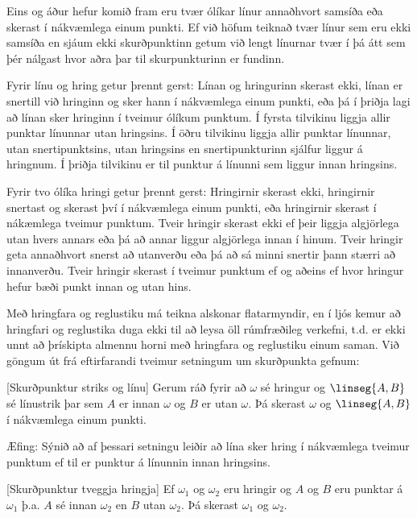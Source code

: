 Eins og áður hefur komið fram eru tvær ólíkar línur annaðhvort samsíða eða skerast í nákvæmlega einum punkti. Ef við höfum teiknað tvær línur sem eru ekki samsíða en sjáum ekki skurðpunktinn getum við lengt línurnar tvær í þá átt sem þér nálgast hvor aðra þar til skurpunkturinn er fundinn.

Fyrir línu og hring getur þrennt gerst: Línan og hringurinn skerast ekki, línan er snertill við hringinn og \glqq sker\grqq{} hann í nákvæmlega einum punkti, eða þá í þriðja lagi að línan sker hringinn í tveimur ólíkum punktum. Í fyrsta tilvikinu liggja allir punktar línunnar utan hringsins. Í öðru tilvikinu liggja allir punktar línunnar, utan snertipunktsins, utan hringsins en snertipunkturinn sjálfur liggur á hringnum. Í þriðja tilvikinu er til punktur á línunni sem liggur innan hringsins.

Fyrir tvo ólíka hringi getur þrennt gerst: Hringirnir skerast ekki, hringirnir snertast og skerast því í nákvæmlega einum punkti, eða hringirnir skerast í nákæmlega tveimur punktum. Tveir hringir skerast ekki ef þeir liggja algjörlega utan hvers annars eða þá að annar liggur algjörlega innan í hinum. Tveir hringir geta annaðhvort snerst að utanverðu eða þá að sá minni snertir þann stærri að innanverðu. Tveir hringir skerast í tveimur punktum ef og aðeins ef hvor hringur hefur bæði punkt innan og utan hins.

Með hringfara og reglustiku má teikna alskonar flatarmyndir, en í ljós kemur að hringfari og reglustika duga ekki til að leysa öll rúmfræðileg verkefni, t.d. er ekki unnt að þrískipta almennu horni með hringfara og reglustiku einum saman. Við göngum út frá eftirfarandi tveimur setningum um skurðpunkta gefnum:

\begin{theorem}\label{concirc_1}[Skurðpunktur striks og línu]
Gerum ráð fyrir að $\omega$ sé hringur og $\linseg{A,B}$ sé línustrik þar sem $A$ er innan $\omega$ og $B$ er utan $\omega$. Þá skerast $\omega$ og $\linseg{A,B}$ í nákvæmlega einum punkti.
\end{theorem}

Æfing: Sýnið að af þessari setningu leiðir að lína sker hring í nákvæmlega tveimur punktum ef til er punktur á línunnin innan hringsins.

\begin{theorem}\label{concirc_2}[Skurðpunktur tveggja hringja]
Ef $\omega_1$ og $\omega_2$ eru hringir og $A$ og $B$ eru punktar á $\omega_1$ þ.a. $A$ sé innan $\omega_2$ en $B$ utan $\omega_2$. Þá skerast $\omega_1$ og $\omega_2$.
\end{theorem}


